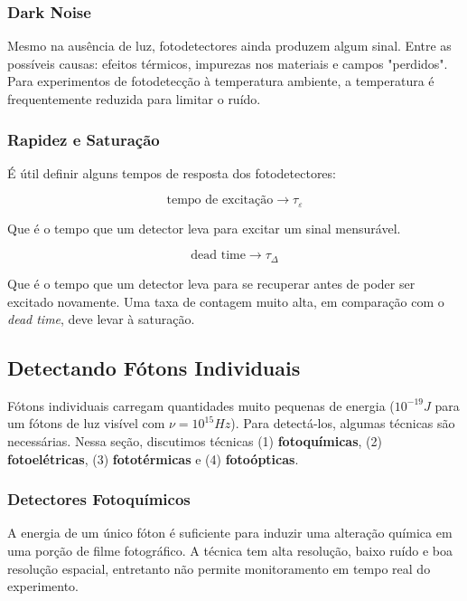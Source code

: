 \subsubsection{Dark Noise}

Mesmo na ausência de luz, fotodetectores ainda produzem algum sinal. Entre as possíveis causas: efeitos térmicos, impurezas nos materiais e campos "perdidos". Para experimentos de fotodetecção à temperatura ambiente, a temperatura é frequentemente reduzida para limitar o ruído.

\subsubsection{Rapidez e Saturação}

É útil definir alguns tempos de resposta dos fotodetectores:

\begin{equation*}
    \text{tempo de excitação}\rightarrow \tau_\varepsilon
\end{equation*}

Que é o tempo que um detector leva para excitar um sinal mensurável.

\begin{equation}
    \text{dead time}\rightarrow \tau_{\Delta}
\end{equation}

Que é o tempo que um detector leva para se recuperar antes de poder ser excitado novamente. Uma taxa de contagem muito alta, em comparação com o \textit{dead time}, deve levar à saturação.

\subsection{Detectando Fótons Individuais}

Fótons individuais carregam quantidades muito pequenas de energia ($10^{-19} J$ para um fótons de luz visível com $\nu=10^{15} Hz$). Para detectá-los, algumas técnicas são necessárias. Nessa seção, discutimos técnicas (1) \textbf{fotoquímicas}, (2) \textbf{fotoelétricas}, (3) \textbf{fototérmicas} e (4) \textbf{fotoópticas}.

\subsubsection{Detectores Fotoquímicos}

A energia de um único fóton é suficiente para induzir uma alteração química em uma porção de filme fotográfico. A técnica tem alta resolução, baixo ruído e boa resolução espacial, entretanto não permite monitoramento em tempo real do experimento.

